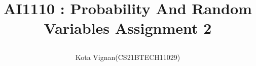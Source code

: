\documentclass[journal,12pt,twocolumn]{IEEEtran}
\begin{document}
	\let\StandardTheFigure\thefigure
	\let\vec\mathbf
	
		
		
		\def\putbox#1#2#3{\makebox[0in][l]{\makebox[#1][l]{}\raisebox{\baselineskip}[0in][0in]{\raisebox{#2}[0in][0in]{#3}}}}
		\def\rightbox#1{\makebox[0in][r]{#1}}
		\def\centbox#1{\makebox[0in]{#1}}
		\def\topbox#1{\raisebox{-\baselineskip}[0in][0in]{#1}}
		\def\midbox#1{\raisebox{-0.5\baselineskip}[0in][0in]{#1}}
	
		
		\title{
			AI1110 : Probability And Random Variables
                                     Assignment 2 
                        
		}
		\author{ 
		            Kota Vignan(CS21BTECH11029)
		}	
		
		
		
\end{document}
